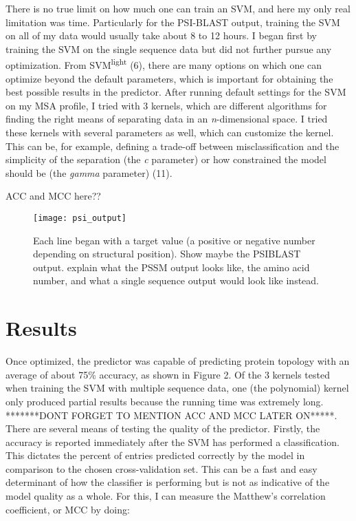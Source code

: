 \documentclass[final]{article}
\begin{document}
There is no true limit on how much one can train an SVM, and here my only real limitation was time. Particularly for the PSI-BLAST output, training the SVM on all of my data would usually take about 8 to 12 hours. I began first by training the SVM on the single sequence data but did not further pursue any optimization. From SVM\textsuperscript{light} (6), there are many options on which one can optimize beyond the default parameters, which is important for obtaining the best possible results in the predictor.  After running default settings for the SVM on my MSA profile, I tried with 3 kernels, which are different algorithms for finding the right means of separating data in an \textit{n}-dimensional space. I tried these kernels with several parameters as well, which can customize the kernel. This can be, for example, defining a trade-off between misclassification and the simplicity of the separation (the \textit{c} parameter) or how constrained the model should be (the \textit{gamma} parameter) (11). 

ACC and MCC here?? 

\begin{figure}
\texttt{[image: psi\_output]}
\caption{Each line began with a target value (a positive or negative number depending on structural position). Show maybe the PSIBLAST output. explain what the PSSM output looks like, the amino acid number, and what a single sequence output would look like instead. \label{psi}}
\end{figure}





\section{Results}

Once optimized, the predictor was capable of predicting protein topology with an average of about 75\% accuracy, as shown in Figure 2. Of the 3 kernels tested when training the SVM with multiple sequence data, one (the polynomial) kernel only produced partial results because the running time was extremely long. *******DONT FORGET TO MENTION ACC AND MCC LATER ON*****. There are several means of testing the quality of the predictor. Firstly, the accuracy is reported immediately after the SVM has performed a classification. This dictates the percent of entries predicted correctly by the model in comparison to the chosen cross-validation set. This can be a fast and easy determinant of how the classifier is performing but is not as indicative of the model quality as a whole. For this, I can measure the Matthew's correlation coefficient, or MCC by doing:
\end{document}

